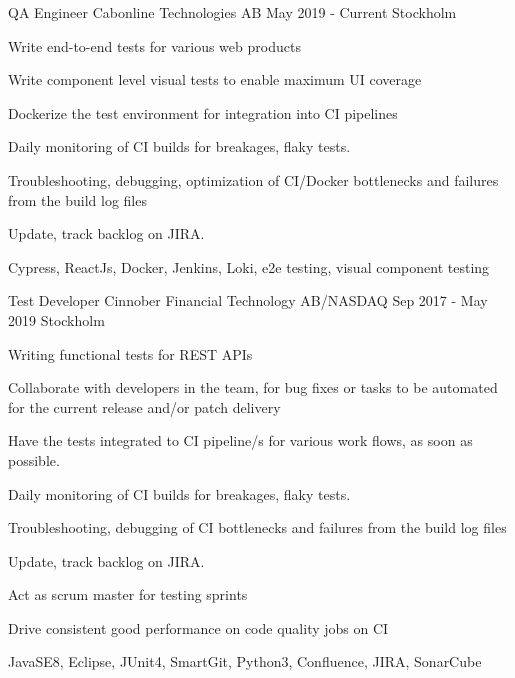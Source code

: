\documentclass[11pt, a4paper]{awesome-cv}
\begin{document}
  \begin{cventries}

    \cventry
      {QA Engineer}
      {Cabonline Technologies AB}
      {May 2019 - Current}
      {Stockholm}
      {
        \begin{cvitems}
          \item Write end-to-end tests for various web products
          \item Write component level visual tests to enable maximum UI coverage
          \item Dockerize the test environment for integration into CI pipelines
          \item Daily monitoring of CI builds for breakages, flaky tests.
          \item Troubleshooting, debugging, optimization of CI/Docker bottlenecks and failures from the build log files
          \item Update, track backlog on JIRA.
          \item Cypress, ReactJs, Docker, Jenkins, Loki, e2e testing, visual component testing
        \end{cvitems}
      }

    \cventry
      {Test Developer}
      {Cinnober Financial Technology AB/NASDAQ}
      {Sep 2017 - May 2019}
      {Stockholm}
      {
        \begin{cvitems}
          \item Writing functional tests for REST APIs
          \item Collaborate with developers in the team, for bug fixes or tasks to be automated
          for the current release and/or patch delivery
          \item Have the tests integrated to CI pipeline/s for various work flows, as soon as possible.
          \item Daily monitoring of CI builds for breakages, flaky tests.
          \item Troubleshooting, debugging of CI bottlenecks and failures from the build log files
          \item Update, track backlog on JIRA.
          \item Act as scrum master for testing sprints
          \item Drive consistent good performance on code quality jobs on CI
          \item JavaSE8, Eclipse, JUnit4, SmartGit, Python3, Confluence, JIRA, SonarCube
        \end{cvitems}
      }


\end{cventries}
\end{document}
